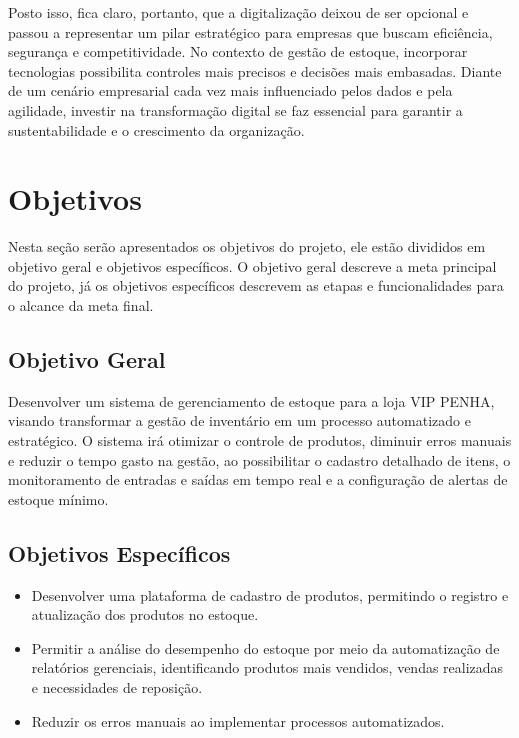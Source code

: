 \documentclass[
	12pt,				%
	openany,			%
	twoside,			%
	a4paper,			%
	english,			%
	brazil				%
	]{abntex2}
\begin{document}
Posto isso, fica claro, portanto, que a digitalização deixou de ser opcional e passou a representar um pilar estratégico para empresas que buscam eficiência, segurança e competitividade. No contexto de gestão de estoque, incorporar tecnologias possibilita controles mais precisos e decisões mais embasadas. Diante de um cenário empresarial cada vez mais influenciado pelos dados e pela agilidade, investir na transformação digital se faz essencial para garantir a sustentabilidade e o crescimento da organização.


\section{Objetivos}

Nesta seção serão apresentados os objetivos do projeto, ele estão divididos em objetivo geral e objetivos específicos. O objetivo geral descreve a meta principal do projeto, já os objetivos específicos descrevem as etapas e funcionalidades para o alcance da meta final.

\subsection{Objetivo Geral}

Desenvolver um sistema de gerenciamento de estoque para a loja VIP PENHA, visando transformar a gestão de inventário em um processo automatizado e estratégico. O sistema irá otimizar o controle de produtos, diminuir erros manuais e reduzir o tempo gasto na gestão, ao possibilitar o cadastro detalhado de itens, o monitoramento de entradas e saídas em tempo real e a configuração de alertas de estoque mínimo. 

\subsection{Objetivos Específicos}

\begin{itemize}
    \item Desenvolver uma plataforma de cadastro de produtos, permitindo o registro e atualização dos produtos no estoque.
    \item Permitir a análise do desempenho do estoque por meio da automatização de relatórios gerenciais, identificando produtos mais vendidos, vendas realizadas e necessidades de reposição.
    \item Reduzir os erros manuais ao implementar processos automatizados.
\end{itemize}
\end{document}
